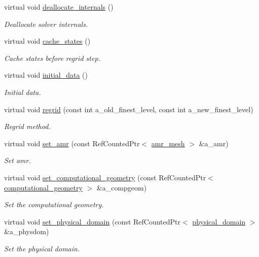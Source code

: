 \begin{DoxyCompactItemize}
virtual void \hyperlink{classcdr__layout_a71412f23f53e4af9892df90b89ae11ca}{deallocate\+\_\+internals} ()
\begin{DoxyCompactList}\small\item\em Deallocate solver internals. \end{DoxyCompactList}\item 
virtual void \hyperlink{classcdr__layout_a7d9874697e6eaa80b10ae2beb2f3e97e}{cache\+\_\+states} ()
\begin{DoxyCompactList}\small\item\em Cache states before regrid step. \end{DoxyCompactList}\item 
virtual void \hyperlink{classcdr__layout_a262dc65daf322076c5e6ce94a0231c2b}{initial\+\_\+data} ()
\begin{DoxyCompactList}\small\item\em Initial data. \end{DoxyCompactList}\item 
virtual void \hyperlink{classcdr__layout_a713662d095a0766ccd9c862fef2b437f}{regrid} (const int a\+\_\+old\+\_\+finest\+\_\+level, const int a\+\_\+new\+\_\+finest\+\_\+level)
\begin{DoxyCompactList}\small\item\em Regrid method. \end{DoxyCompactList}\item 
virtual void \hyperlink{classcdr__layout_a5b7643786260da4838e3d2eee86cd2de}{set\+\_\+amr} (const Ref\+Counted\+Ptr$<$ \hyperlink{classamr__mesh}{amr\+\_\+mesh} $>$ \&a\+\_\+amr)
\begin{DoxyCompactList}\small\item\em Set amr. \end{DoxyCompactList}\item 
virtual void \hyperlink{classcdr__layout_a87a39fbd12119d9763baa4f31eaaf87a}{set\+\_\+computational\+\_\+geometry} (const Ref\+Counted\+Ptr$<$ \hyperlink{classcomputational__geometry}{computational\+\_\+geometry} $>$ \&a\+\_\+compgeom)
\begin{DoxyCompactList}\small\item\em Set the computational geometry. \end{DoxyCompactList}\item 
virtual void \hyperlink{classcdr__layout_a96eb878b0c3504fddde6b42899ff46d4}{set\+\_\+physical\+\_\+domain} (const Ref\+Counted\+Ptr$<$ \hyperlink{classphysical__domain}{physical\+\_\+domain} $>$ \&a\+\_\+physdom)
\begin{DoxyCompactList}\small\item\em Set the physical domain. \end{DoxyCompactList}\item 

\end{DoxyCompactItemize}
